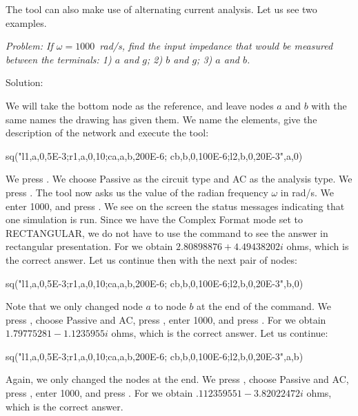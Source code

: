The  tool can also make use of alternating current
analysis. Let us see two examples.


\emph{Problem: If $\omega = 1000$~rad/s, find the input impedance
that would be measured between the terminals: 1) $a$ and $g$; 2) $b$
and $g$; 3) $a$ and $b$.}

Solution:

We will take the bottom node as the reference, and leave nodes $a$
and $b$ with the same names the drawing has given them. We name the
elements, give the description of the network and execute the
 tool:

\begin{entry}
sq\thevenin("l1,a,0,5E-3;r1,a,0,10;ca,a,b,200E-6;
            cb,b,0,100E-6;l2,b,0,20E-3",a,0)
\end{entry}

We press . We choose Passive as the circuit type and AC
as the analysis type. We press . The  tool
now asks us the value of the radian frequency $\omega$ in rad/s. We
enter 1000, and press . We see on the screen the status
messages indicating that one simulation is run. Since we have the
Complex Format mode set to RECTANGULAR, we do not have to use the
 command to see the answer in rectangular presentation.
For  we obtain $2.80898876 + 4.49438202i$ ohms, which is
the correct answer. Let us continue then with the next pair of
nodes:

\begin{entry}
sq\thevenin("l1,a,0,5E-3;r1,a,0,10;ca,a,b,200E-6;
            cb,b,0,100E-6;l2,b,0,20E-3",b,0)
\end{entry}

Note that we only changed node $a$ to node $b$ at the end of the
command. We press , choose Passive and AC, press
, enter 1000, and press . For  we
obtain $1.79775281 - 1.1235955i$ ohms, which is the correct answer.
Let us continue:

\begin{entry}
sq\thevenin("l1,a,0,5E-3;r1,a,0,10;ca,a,b,200E-6;
            cb,b,0,100E-6;l2,b,0,20E-3",a,b)
\end{entry}

Again, we only changed the nodes at the end. We press ,
choose Passive and AC, press , enter 1000, and press
. For  we obtain $.112359551 - 3.82022472i$
ohms, which is the correct answer.

